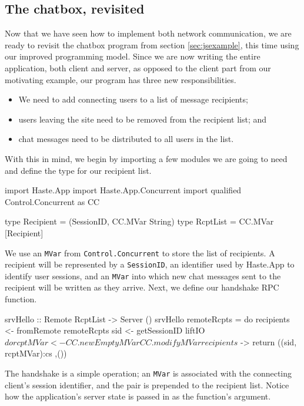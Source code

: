 \documentclass[preprint]{sigplanconf}
\begin{document}
\subsection{The chatbox, revisited}\label{sec:chatboxrevisited}

Now that we have seen how to implement both network communication, we are ready
to revisit the chatbox program from section \ref{sec:jsexample}, this time
using our improved programming model. Since we are now writing the entire
application, both client and server, as opposed to the client part from our
motivating example, our program has three new responsibilities.

\begin{itemize}
  \item We need to add connecting users to a list of message recipients;
  \item users leaving the site need to be removed from the recipient list; and
  \item chat messages need to be distributed to all users in the list.
\end{itemize}

With this in mind, we begin by importing a few modules we are going to need and
define the type for our recipient list.

\begin{code}
import Haste.App
import Haste.App.Concurrent
import qualified Control.Concurrent as CC

type Recipient = (SessionID, CC.MVar String)
type RcptList = CC.MVar [Recipient]
\end{code}

We use an \lstinline!MVar! from \lstinline!Control.Concurrent! to store the
list of recipients. A recipient will be represented by a \lstinline!SessionID!,
an identifier used by Haste.App to identify user sessions, and an
\lstinline!MVar! into which new chat messages sent to the recipient will be
written as they arrive. Next, we define our handshake RPC function.

\begin{code}
srvHello :: Remote RcptList -> Server ()
srvHello remoteRcpts = do
  recipients <- fromRemote remoteRcpts
  sid <- getSessionID
  liftIO $ do
    rcptMVar <- CC.newEmptyMVar
    CC.modifyMVar recipients $ \cs ->
      return ((sid, rcptMVar):cs ,())
\end{code}

The handshake is a simple operation; an \lstinline!MVar! is associated with the
connecting client's session identifier, and the pair is prepended to the
recipient list. Notice how the application's server state is passed in as the
function's argument.
\end{document}

